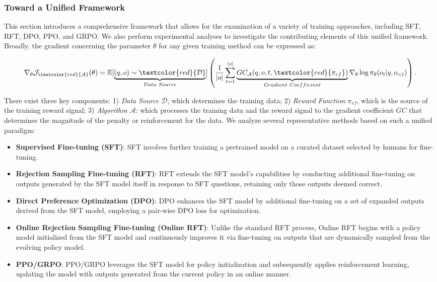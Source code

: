 \begin{itemize}[topsep=0pt]
\begin{itemize}[topsep=0pt]
\subsubsection{Toward a Unified Framework} This section introduces a comprehensive framework that allows for the examination of a variety of training approaches, including SFT, RFT, DPO, PPO, and GRPO. We also perform experimental analyses to investigate the contributing elements of this unified framework. Broadly, the gradient concerning the parameter $\theta$ for any given training method can be expressed as:

\begin{equation}
    \nabla_{\theta}\mathcal{J}_{\textcolor{red}{\mathcal{A}}}(\theta) = \mathbb{E}[\underbrace{(q,o) \sim \textcolor{red}{\mathcal{D}}}_{Data \ Source}]\left( \frac{1}{|o|} \sum_{t=1}^{|o|}  \underbrace{GC_{{\mathcal{A}}}(q, o, t, \textcolor{red}{\pi_{{rf}}})}_{Gradient \ Coefficient}  \nabla_{\theta}\log \pi_{\theta}(o_t | q, o_{<t})\right).
\label{eq:objective}
\end{equation}

There exist three key components: 1) \textit{Data Source $\mathcal{D}$}, which determines the training data; 2) \textit{Reward Function $\pi_{{rf}}$}, which is the source of the training reward signal; 3) \textit{Algorithm $\mathcal{A}$}: which processes the training data and the reward signal to the gradient coefficient $GC$ that determines the magnitude of the penalty or reinforcement for the data. We analyze several representative methods based on such a unified paradigm:

\begin{itemize}
    \item  \textbf{Supervised Fine-tuning (SFT)}: SFT involves further training a pretrained model on a curated dataset selected by humans for fine-tuning.
    \item \textbf{Rejection Sampling Fine-tuning (RFT)}: RFT extends the SFT model's capabilities by conducting additional fine-tuning on outputs generated by the SFT model itself in response to SFT questions, retaining only those outputs deemed correct.
    \item \textbf{Direct Preference Optimization (DPO)}: DPO enhances the SFT model by additional fine-tuning on a set of expanded outputs derived from the SFT model, employing a pair-wise DPO loss for optimization.
    \item \textbf{Online Rejection Sampling Fine-tuning (Online RFT)}: Unlike the standard RFT process, Online RFT begins with a policy model initialized from the SFT model and continuously improves it via fine-tuning on outputs that are dynamically sampled from the evolving policy model.
    \item \textbf{PPO/GRPO}: PPO/GRPO leverages the SFT model for policy initialization and subsequently applies reinforcement learning, updating the model with outputs generated from the current policy in an online manner.
\end{itemize}


\end{itemize}
\end{itemize}
